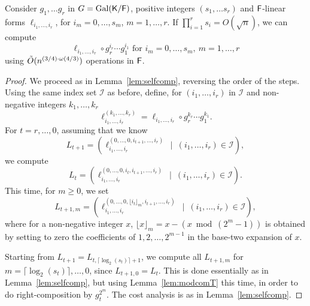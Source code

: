 \begin{lemma}
  \label{lem:transmodcomp}
  Consider $g_1, \ldots g_r$ in $G=\mathrm{Gal}({\mathsf{K}}/{\mathsf{F}})$, positive
  integers $(s_1, \ldots s_r)$ and ${\mathsf{F}}$-linear forms $\ell_{i_1,
    \dots, i_r}$, for $i_m=0,\dots,s_m$, $m=1,\dots,r$. If $\prod_{i =
    1}^r s_i = O(\sqrt{n})$, we can compute
  $$\ell_{i_1, \dots, i_r} \circ g_r^{i_r}\cdots g_1^{i_1}
  \text{~for~} i_m=0,\dots,s_m,\ m=1,\dots,r
  $$  using $\tilde{O}(n^{(3/4)\cdot \omega(4/3)})$ operations in ${\mathsf{F}}$.
\end{lemma} 
\begin{proof}
  We proceed as in Lemma~\ref{lem:selfcomp}, reversing the order of
  the steps. Using the same index set $\mathcal I$ as before, define,
  for $(i_1,\dots,i_r)$ in $\mathcal I$ and non-negative integers
  $k_1,\dots,k_r$
  $$\ell_{i_1,\dots,i_r}^{(k_1,\dots,k_r)} =\ell_{i_1,\dots,i_r} \circ g_r^{k_r}\cdots g_1^{k_1}.$$
  For $t=r,\dots,0$, assuming that
  we know 
  $$L_{t+1} = (\ell_{i_1, \dots,i_r}^{(0, \dots, 0,i_{t+1},\dots,i_r)} \ \mid
  \ (i_1,\dots,i_r)\in \mathcal I),$$ we compute 
  $$L_{t}=(\ell_{i_1, \dots,i_r}^{(0, \dots, 0,i_{t},i_{t+1},\dots,i_r)}
  \ \mid \ (i_1,\dots,i_r)\in \mathcal I).$$
  This time, for $m \ge 0$, we set
  $$L_{t+1,m} = (\ell_{i_1, \dots,i_r}^{(0, \dots, 0,\lfloor i_{t}
    \rfloor_m,i_{t+1},\dots,i_r)} \ \mid \ (i_1,\dots,i_r)\in \mathcal
  I),$$ where for a non-negative integer $x$, $\lfloor x \rfloor_m = x
  - (x \bmod (2^m-1))$ is obtained by setting to zero the coefficients
  of $1,2,\dots,2^{m-1}$ in the base-two expansion of $x$.

  Starting from $L_{t+1} = L_{t, \lceil \log_2(s_t) \rceil +1}$, we
  compute all $L_{t+1,m}$ for $m= \lceil \log_2(s_t) \rceil,\dots,0$,
  since $L_{t+1,0} = L_{t}$. This is done essentially as in
  Lemma~\ref{lem:selfcomp}, but using Lemma~\ref{lem:modcomT} this
  time, in order to do right-composition by $g_t^{2^m}$.
  The cost analysis is as in Lemma~\ref{lem:selfcomp}.
\end{proof}


